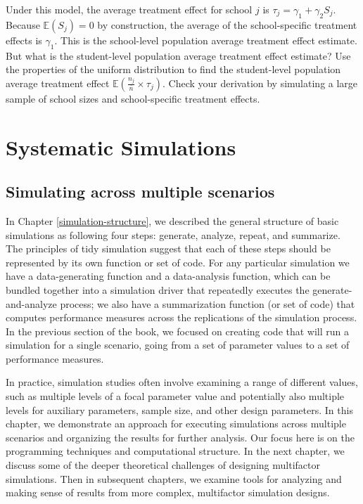 \documentclass[
]{book}
\newcommand{\E}{\mathbb{E}}
\begin{document}
Under this model, the average treatment effect for school \(j\) is \(\tau_j = \gamma_1 + \gamma_2 S_j\). Because \(\E(S_j) = 0\) by construction, the average of the school-specific treatment effects is \(\gamma_1\). This is the school-level population average treatment effect estimate. But what is the student-level population average treatment effect estimate? Use the properties of the uniform distribution to find the student-level population average treatment effect \(\E\left( \frac{n_j}{\bar{n}} \times \tau_j \right)\). Check your derivation by simulating a large sample of school sizes and school-specific treatment effects.

\part{Systematic Simulations}\label{part-systematic-simulations}

\chapter{Simulating across multiple scenarios}\label{simulating-multiple-scenarios}

In Chapter \ref{simulation-structure}, we described the general structure of basic simulations as following four steps: generate, analyze, repeat, and summarize.
The principles of tidy simulation suggest that each of these steps should be represented by its own function or set of code.
For any particular simulation we have a data-generating function and a data-analysis function, which can be bundled together into a simulation driver that repeatedly executes the generate-and-analyze process; we also have a summarization function (or set of code) that computes performance measures across the replications of the simulation process.
In the previous section of the book, we focused on creating code that will run a simulation for a single scenario, going from a set of parameter values to a set of performance measures.

In practice, simulation studies often involve examining a range of different values, such as multiple levels of a focal parameter value and potentially also multiple levels for auxiliary parameters, sample size, and other design parameters.
In this chapter, we demonstrate an approach for executing simulations across multiple scenarios and organizing the results for further analysis.
Our focus here is on the programming techniques and computational structure.
In the next chapter, we discuss some of the deeper theoretical challenges of designing multifactor simulations.
Then in subsequent chapters, we examine tools for analyzing and making sense of results from more complex, multifactor simulation designs.
\end{document}
